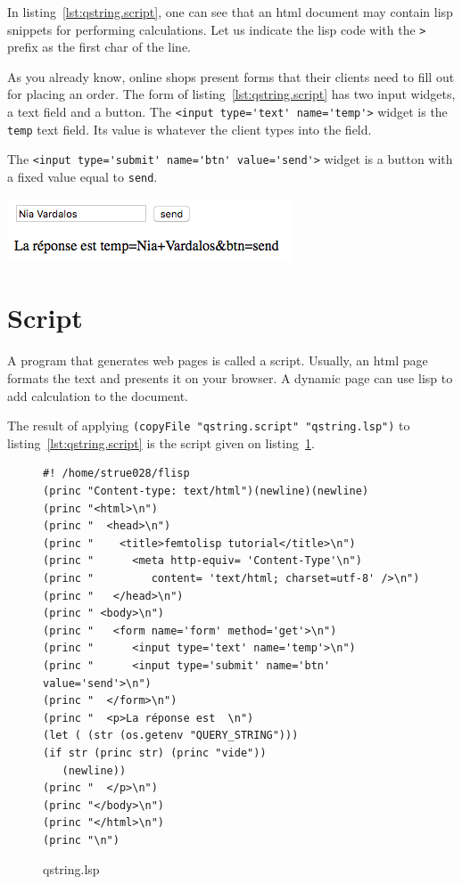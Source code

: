 \documentclass[a4paper,12pt]{book}
\begin{document}
In listing~\ref{lst:qstring.script}, one can see
that an html document may contain lisp
snippets for performing calculations. Let us
indicate the lisp code with the \verb|>| prefix
as the first char of the line.

As you already know, online shops
present forms that their clients need to fill out
for placing an order. The form of
listing~\ref{lst:qstring.script}
has two input widgets, a text field and
a button. The \verb|<input type='text' name='temp'>|
widget is the \verb|temp| text field.
Its value is whatever the client types into the field.

The \verb|<input type='submit' name='btn' value='send'>|
widget is a button with a fixed value equal to \verb|send|.

\includegraphics[scale=0.5]{figs/form.png}

\section{Script}
A program that generates
web pages is called a script.
Usually, an html page formats the text
and presents it on your browser.
A dynamic page can use lisp to add
calculation to the document.

The result of applying 
\verb|(copyFile "qstring.script" "qstring.lsp")|
to  listing~\ref{lst:qstring.script}
is the script given on listing~\ref{lst:qstring.lsp}.

\begin{figure}[!h]
\begin{verbatim}
#! /home/strue028/flisp
(princ "Content-type: text/html")(newline)(newline)
(princ "<html>\n")
(princ "  <head>\n")
(princ "    <title>femtolisp tutorial</title>\n")
(princ "      <meta http-equiv= 'Content-Type'\n")
(princ "         content= 'text/html; charset=utf-8' />\n")
(princ "   </head>\n")
(princ " <body>\n")
(princ "   <form name='form' method='get'>\n")
(princ "      <input type='text' name='temp'>\n")
(princ "      <input type='submit' name='btn' value='send'>\n")
(princ "  </form>\n")
(princ "  <p>La réponse est  \n")
(let ( (str (os.getenv "QUERY_STRING")))
(if str (princ str) (princ "vide"))
   (newline))
(princ "  </p>\n")
(princ "</body>\n")
(princ "</html>\n")
(princ "\n")
\end{verbatim}
\caption{qstring.lsp}
\label{lst:qstring.lsp}
\end{figure}
\end{document}
